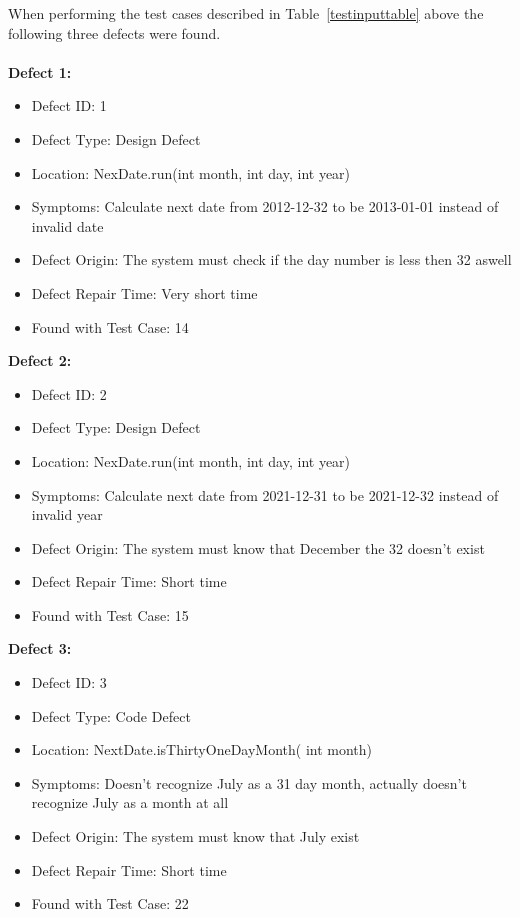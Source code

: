 When performing the test cases described in Table~\ref{testinputtable} above the following three defects were found.\\\\

\noindent\textbf{Defect 1:}
\begin{itemize}
 \item Defect ID: 1
 \item Defect Type: Design Defect
 \item Location: NexDate.run(int month, int day, int year)
 \item Symptoms: Calculate next date from 2012-12-32 to be 2013-01-01 instead of invalid date
 \item Defect Origin: The system must check if the day number is less then 32 aswell
 \item Defect Repair Time: Very short time
 \item Found with Test Case: 14
\end{itemize}

\noindent \textbf{Defect 2:}
\begin{itemize}
 \item Defect ID: 2
 \item Defect Type: Design Defect
 \item Location: NexDate.run(int month, int day, int year)
 \item Symptoms: Calculate next date from 2021-12-31 to be 2021-12-32 instead of invalid year
 \item Defect Origin: The system must know that December the 32 doesn't exist
 \item Defect Repair Time: Short time
 \item Found with Test Case: 15
\end{itemize}

\noindent \textbf{Defect 3:}
\begin{itemize}
 \item Defect ID: 3
 \item Defect Type: Code Defect
 \item Location: NextDate.isThirtyOneDayMonth( int month)
 \item Symptoms: Doesn't recognize July as a 31 day month, actually doesn't recognize July as a month at all
 \item Defect Origin: The system must know that July exist
 \item Defect Repair Time: Short time
 \item Found with Test Case: 22 
\end{itemize}


